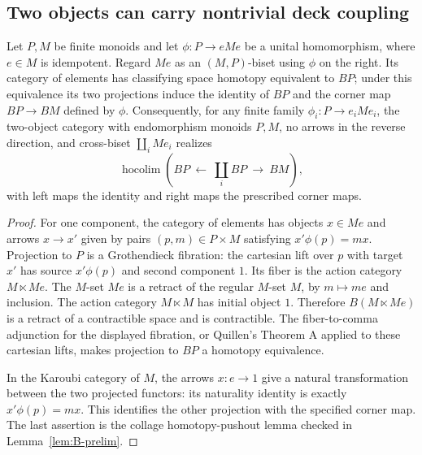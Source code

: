 \subsection{Two objects can carry nontrivial deck coupling}

\begin{lemma}
\label{D:corner-biset}
Let $P,M$ be finite monoids and let $\phi:P\to eMe$ be a unital
homomorphism, where $e\in M$ is idempotent. Regard $Me$ as an $(M,P)$-biset
using $\phi$ on the right. Its category of elements has classifying space
homotopy equivalent to $BP$; under this equivalence its two projections
induce the identity of $BP$ and the corner map $BP\to BM$ defined by $\phi$.
Consequently, for any finite family $\phi_i:P\to e_iMe_i$, the two-object
category with endomorphism monoids $P,M$, no arrows in the reverse
direction, and cross-biset $\coprod_i Me_i$ realizes
\[
 \operatorname{hocolim}\left(
 BP\ \longleftarrow\ \coprod_i BP\ \longrightarrow\ BM\right),
\]
with left maps the identity and right maps the prescribed corner maps.
\end{lemma}
\begin{proof}
For one component, the category of elements has objects $x\in Me$ and
arrows $x\to x'$ given by pairs $(p,m)\in P\times M$ satisfying
$x'\phi(p)=mx$. Projection to $P$ is a Grothendieck fibration:
the cartesian lift over $p$ with target $x'$ has source $x'\phi(p)$
and second component $1$. Its fiber is the action category $M\ltimes Me$.
The $M$-set $Me$ is a retract of the regular $M$-set $M$, by
$m\mapsto me$ and inclusion. The action category $M\ltimes M$ has initial
object $1$. Therefore $B(M\ltimes Me)$ is a retract of a contractible
space and is contractible. The fiber-to-comma adjunction for the displayed
fibration, or Quillen's Theorem A applied to these cartesian lifts, makes
projection to $BP$ a homotopy equivalence.

In the Karoubi category of $M$, the arrows $x:e\to1$ give a natural
transformation between the two projected functors: its naturality
identity is exactly $x'\phi(p)=mx$. This identifies the other projection
with the specified corner map. The last assertion is the collage
homotopy-pushout lemma checked in Lemma~\ref{lem:B-prelim}.
\end{proof}


